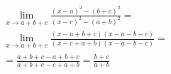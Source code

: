 \begin{ex}
\begin{align}
&\lim_{x\rightarrow a+b+c} \frac{(x-a)^2-(b+c)^2}{(x-c)^2-(a+b)^2}=\nonumber\\
&\lim_{x\rightarrow a+b+c} \frac{(x-a+b+c)(x-a-b-c)}{(x-c+a+b)(x-a-b-c)}=\nonumber\\
&=\frac{a+b+c-a+b+c}{a+b+c-c+a+b}=\frac{b+c}{a+b}\nonumber
\end{align}
\end{ex}